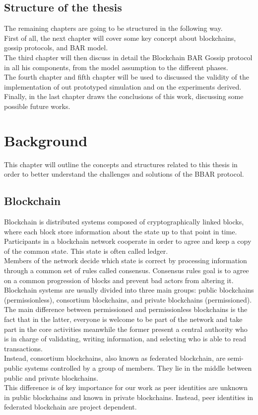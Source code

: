 \documentclass[mscthesis]{usiinfthesis}
\begin{document}
\section{Structure of the thesis}
The remaining chapters are going to be structured in the following way. \\
First of all, the next chapter will cover some key concept about blockchains, gossip protocols, and BAR model. \\
The third chapter will then discuss in detail the Blockchain BAR Gossip protocol in all his components, from the model assumption to the different phases. \\
The fourth chapter and fifth chapter will be used to discussed the validity of the implementation of out prototyped simulation and on the experiments derived. \\
Finally, in the last chapter draws the conclusions of this work, discussing some possible future works.

\chapter{Background}
This chapter will outline the concepts and structures related to this thesis in order to better understand the challenges and solutions of the BBAR protocol.

\section{Blockchain}
Blockchain is distributed systems composed of cryptographically linked blocks, where each block store information about the state up to that point in time. Participants in a blockchain network cooperate in order to agree and keep a copy of the common state. This state is often called ledger. \\
Members of the network decide which state is correct by processing information through a common set of rules called consensus. Consensus rules goal is to agree on a common progression of blocks and prevent bad actors from altering it. \\
Blockchain systems are usually divided into three main groups: public blockchains (permissionless), consortium blockchains, and private blockchains (permissioned). \\
The main difference between permissioned and permissionless blockchains is the fact that in the latter, everyone is welcome to be part of the network and take part in the core activities meanwhile the former present a central authority who is in charge of validating, writing information, and selecting who is able to read transactions.  \\
Instead, consortium blockchains, also known as federated blockchain, are semi-public systems controlled by a group of members. They lie in the middle between public and private blockchains. \\
This difference is of key importance for our work as peer identities are unknown in public blockchains and known in private blockchains. Instead, peer identities in federated blockchain are project dependent.
\end{document}
